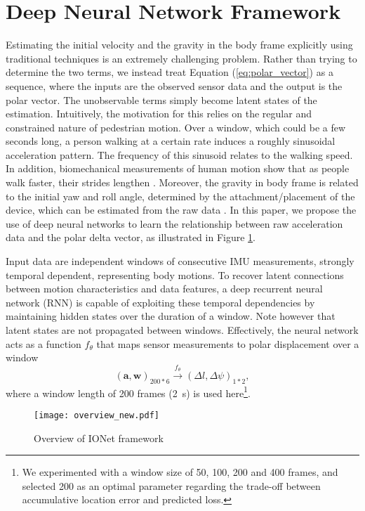 \documentclass[letterpaper]{article}
\begin{document}
\section{Deep Neural Network Framework}
Estimating the initial velocity and the gravity in the body frame explicitly using traditional techniques is an extremely challenging problem. Rather than trying to determine the two terms, we instead treat Equation (\ref{eq:polar_vector}) as a sequence, where the inputs are the observed sensor data and the output is the polar vector. The unobservable terms simply become latent states of the estimation. Intuitively, the motivation for this relies on the regular and constrained nature of pedestrian motion. Over a window, which could be a few seconds long, a person walking at a certain rate induces a roughly sinusoidal acceleration pattern. The frequency of this sinusoid relates to the walking speed. In addition, biomechanical measurements of human motion show that as people walk faster, their strides lengthen \cite{Hausdorff2007}. Moreover, the gravity in body frame is related to the initial yaw and roll angle, determined by the attachment/placement of the device, which can be estimated from the raw data \cite{Xiao2015a}. In this paper, we propose the use of deep neural networks to learn the relationship between raw acceleration data and the polar delta vector, as illustrated in Figure \ref{fig:overview}.

Input data are independent windows of consecutive IMU measurements, strongly temporal dependent, representing body motions. To recover latent connections between motion characteristics and data features, a deep recurrent neural network (RNN) is capable of exploiting these temporal dependencies by maintaining hidden states over the duration of a window. Note however that latent states are not propagated between windows. Effectively, the neural network acts as a function $f_{\theta}$ that maps sensor measurements to polar displacement over a window
	\begin{equation}
		(\mathbf{a}, \mathbf{w})_{200*6} \xrightarrow{f_{\theta}} (\Delta l, \Delta \psi)_{1*2},
	\end{equation}
where a window length of 200 frames (2~s) is used here\footnote{We experimented with a window size of 50, 100, 200 and 400 frames, and selected 200 as an optimal parameter regarding the trade-off between accumulative location error and predicted loss.}.
     \begin{figure}
     	\centering
         \texttt{[image: overview\_new.pdf]}
         \caption{\label{fig:overview}Overview of IONet framework}
     \end{figure}
\end{document}
